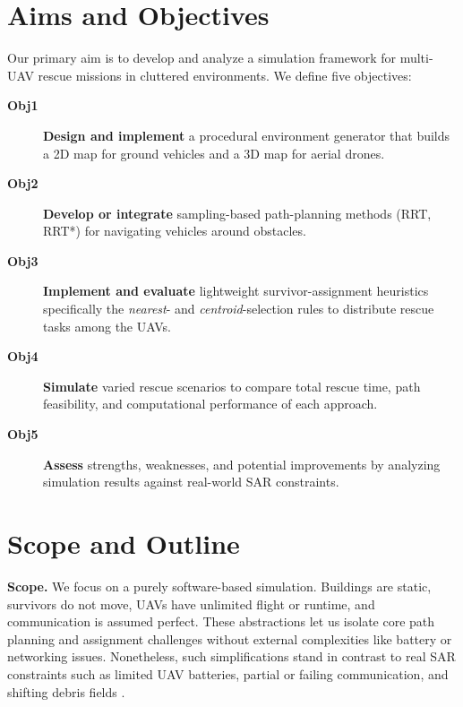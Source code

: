 \documentclass[12pt,a4paper]{report}
\begin{document}
\section{Aims and Objectives}
\label{sec:aims}
Our primary aim is to develop and analyze a simulation framework for multi-UAV rescue
missions in cluttered environments. We define five objectives:

\begin{description}
    \item[\textbf{Obj1}] \textbf{Design and implement} a procedural environment
    generator that builds a 2D map for ground vehicles and a 3D map for aerial drones.

    \item[\textbf{Obj2}] \textbf{Develop or integrate} sampling-based path-planning
    methods (RRT, RRT*) for navigating vehicles around obstacles.

    \item[\textbf{Obj3}] \textbf{Implement and evaluate} lightweight survivor-assignment heuristics specifically the \emph{nearest}- and \emph{centroid}-selection rules to distribute rescue tasks among the UAVs.




    \item[\textbf{Obj4}] \textbf{Simulate} varied rescue scenarios to compare total
    rescue time, path feasibility, and computational performance of each approach.

    \item[\textbf{Obj5}] \textbf{Assess} strengths, weaknesses, and potential
    improvements by analyzing simulation results against real-world SAR constraints.
\end{description}

\section{Scope and Outline}
\label{sec:scope}
\textbf{Scope.} We focus on a purely software-based simulation. Buildings are static,
survivors do not move, UAVs have unlimited flight or runtime, and communication is assumed
perfect. These abstractions let us isolate core path planning and assignment challenges
without external complexities like battery or networking issues. Nonetheless, such
simplifications stand in contrast to real SAR constraints such as limited UAV batteries,
partial or failing communication, and shifting debris fields \cite{Murphy2014DisasterRobotics}.
\end{document}
